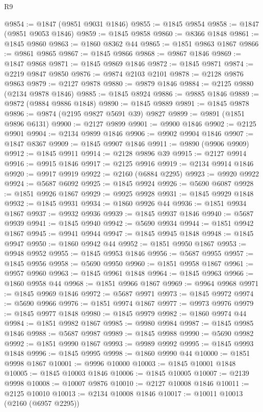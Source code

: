\begin{lexlean}{R9}
\begin{coremodule}
@9854 := @1847 (@9851 @9031 @1846)
@9855 := @1845 @9854
@9858 := @1847 (@9851 @9053 @1846)
@9859 := @1845 @9858
@9860 := @8366 @1848
@9861 := @1845 @9860
@9863 := @1860 @8362 @44
@9865 := @1851 @9863 @1867
@9866 := @9861 @9865
@9867 := @1845 @9866
@9868 := @9867 @1846
@9869 := @1847 @9868
@9871 := @1845 @9869 @1846
@9872 := @1845 @9871
@9874 := @2219 @9847 @9850
@9876 := @9874 @2103 @2101
@9878 := @2128 @9876 @9863
@9879 := @2127 @9878
@9880 := @9879 @1846
@9884 := @2125 @9880 (@2134 @9878 @1846)
@9885 := @1845 @8924
@9886 := @9885 @1846
@9889 := @9872 (@9884 @9886 @1848)
@9890 := @1845 @9889
@9891 := @1845 @9878
@9896 := @9874 (@2195 @9827 @5691 @39) @9827
@9899 := @9891 (@1851 @9896 @6131)
@9900 := @2127 @9899
@9901 := @9900 @1846
@9902 := @2125 @9901
@9904 := @2134 @9899 @1846
@9906 := @9902 @9904 @1846
@9907 := @1847 @8367
@9909 := @1845 @9907 @1846
@9911 := @9890 (@9906 @9909)
@9912 := @1845 @9911
@9914 := @2128 @9896 @39
@9915 := @2127 @9914
@9916 := @9915 @1846
@9917 := @2125 @9916
@9919 := @2134 @9914 @1846
@9920 := @9917 @9919
@9922 := @2160 (@6884 @2295)
@9923 := @9920 @9922
@9924 := @5687 @6092
@9925 := @1845 @9924
@9926 := @5690 @6087
@9928 := @1851 @9926 @1867
@9929 := @9925 @9928
@9931 := @1845 @9929 @1848
@9932 := @1845 @9931
@9934 := @1860 @9926 @44
@9936 := @1851 @9934 @1867
@9937 := @9932 @9936
@9939 := @1845 @9937 @1846
@9940 := @5687 @9939
@9941 := @1845 @9940
@9942 := @5690 @9934
@9944 := @1851 @9942 @1867
@9945 := @9941 @9944
@9947 := @1845 @9945 @1848
@9948 := @1845 @9947
@9950 := @1860 @9942 @44
@9952 := @1851 @9950 @1867
@9953 := @9948 @9952
@9955 := @1845 @9953 @1846
@9956 := @5687 @9955
@9957 := @1845 @9956
@9958 := @5690 @9950
@9960 := @1851 @9958 @1867
@9961 := @9957 @9960
@9963 := @1845 @9961 @1848
@9964 := @1845 @9963
@9966 := @1860 @9958 @44
@9968 := @1851 @9966 @1867
@9969 := @9964 @9968
@9971 := @1845 @9969 @1846
@9972 := @5687 @9971
@9973 := @1845 @9972
@9974 := @5690 @9966
@9976 := @1851 @9974 @1867
@9977 := @9973 @9976
@9979 := @1845 @9977 @1848
@9980 := @1845 @9979
@9982 := @1860 @9974 @44
@9984 := @1851 @9982 @1867
@9985 := @9980 @9984
@9987 := @1845 @9985 @1846
@9988 := @5687 @9987
@9989 := @1845 @9988
@9990 := @5690 @9982
@9992 := @1851 @9990 @1867
@9993 := @9989 @9992
@9995 := @1845 @9993 @1848
@9996 := @1845 @9995
@9998 := @1860 @9990 @44
@10000 := @1851 @9998 @1867
@10001 := @9996 @10000
@10003 := @1845 @10001 @1848
@10005 := @1845 @10003 @1846
@10006 := @1845 @10005
@10007 := @2139 @9998
@10008 := @10007 @9876
@10010 := @2127 @10008 @1846
@10011 := @2125 @10010
@10013 := @2134 @10008 @1846
@10017 := @10011 @10013 (@2160 (@6957 @2295))

\end{coremodule}
\end{lexlean}

